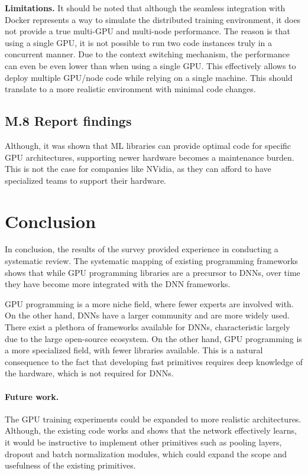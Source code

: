 \textbf{Limitations.}
It should be noted that although the seamless integration with Docker represents a way to simulate
the distributed training environment, it does not provide a true multi-GPU and multi-node performance.
The reason is that using a single GPU, it is not possible to run two code instances truly in a concurrent manner.
Due to the context switching mechanism, the performance can even be even lower than when using a single GPU.
This effectively allows to deploy multiple GPU/node code while relying on a single machine. This should
translate to a more realistic environment with minimal code changes.

\subsection{M.8 Report findings}

Although, it was shown that ML libraries can provide optimal code for specific GPU architectures,
supporting newer hardware becomes a maintenance burden. This is not the case for companies like NVidia,
as they can afford to have specialized teams to support their hardware.

\section{Conclusion}
In conclusion, the results of the survey provided experience in conducting a systematic review. 
The systematic mapping of existing programming frameworks shows that while GPU programming libraries
are a precursor to DNNs, over time they have become more integrated with the DNN frameworks.

GPU programming is a more niche field, where fewer experts are involved with. On the other hand,
DNNs have a larger community and are more widely used. There exist a plethora of frameworks available
for DNNs, characteristic largely due to the large open-source ecosystem. On the other hand, GPU programming
is a more specialized field, with fewer libraries available. This is a natural consequence to the fact
that developing fast primitives requires deep knowledge of the hardware, which is not required for DNNs.


\paragraph{Future work.}
The GPU training experiments could be expanded to more realistic architectures. Although,
the existing code works and shows that the network effectively learns, it would be instructive
to implement other primitives such as pooling layers, dropout and batch normalization modules,
which could expand the scope and usefulness of the existing primitives.


